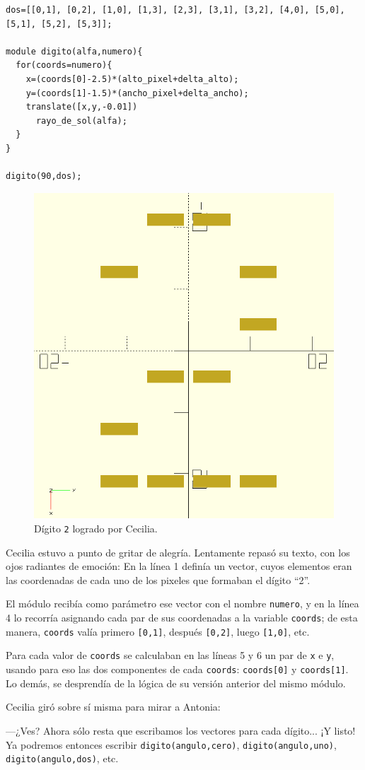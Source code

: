      \begin{lstlisting}
dos=[[0,1], [0,2], [1,0], [1,3], [2,3], [3,1], [3,2], [4,0], [5,0], [5,1], [5,2], [5,3]];

module digito(alfa,numero){
  for(coords=numero){
    x=(coords[0]-2.5)*(alto_pixel+delta_alto);
    y=(coords[1]-1.5)*(ancho_pixel+delta_ancho);
    translate([x,y,-0.01])
      rayo_de_sol(alfa);
  }
}

digito(90,dos);
\end{lstlisting}

\begin{figure}[ht]
  \centering
  \includegraphics[width=.4\textwidth]{imagenes/dos-cecilia}  
  \caption{Dígito \texttt{2} logrado por Cecilia.}
  \label{fig:dos-cecilia}
\end{figure}

Cecilia estuvo a punto de gritar de alegría. Lentamente repasó su
texto, con los ojos radiantes de emoción: En la línea 1 definía un
vector, cuyos elementos eran las coordenadas de cada uno de los
pixeles que formaban el dígito ``2''.

El módulo recibía como parámetro ese vector con el nombre
\lstinline!numero!, y en la línea 4 lo recorría asignando cada par de
sus coordenadas a la variable \lstinline!coords!; de esta manera,
\lstinline!coords! valía primero \lstinline![0,1]!, después
\lstinline![0,2]!, luego \lstinline![1,0]!, etc.

Para cada valor de \lstinline!coords! se calculaban en las líneas 5 y
6 un par de \lstinline!x! e \lstinline!y!, usando para eso las dos
componentes de cada \lstinline!coords!: \lstinline!coords[0]! y
\lstinline!coords[1]!. Lo demás, se desprendía de la lógica de su
versión anterior del mismo módulo.

Cecilia giró sobre sí misma para mirar a Antonia:

---¿Ves?  Ahora sólo resta que escribamos los vectores para cada
dígito... ¡Y listo!  Ya podremos entonces escribir
\lstinline!digito(angulo,cero)!, \lstinline!digito(angulo,uno)!,
\lstinline!digito(angulo,dos)!, etc.

